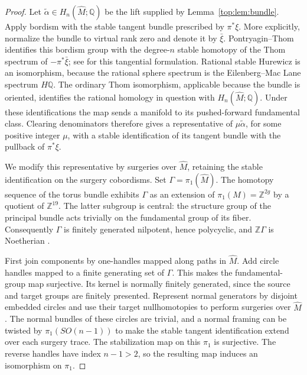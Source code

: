 \documentclass[11pt]{article}
\numberwithin{equation}{section}
\theoremstyle{definition}
\theoremstyle{remark}
\begin{document}
\begin{proof}
Let $\widetilde\alpha\in H_n(\widehat M;\mathbb Q)$ be the lift supplied by
Lemma~\ref{top:lem:bundle}.  Apply bordism with the stable tangent bundle
prescribed by $\pi^*\xi$.  More explicitly, normalize the bundle to
virtual rank zero and denote it by $\bar\xi$.  Pontryagin--Thom identifies
this bordism group with the degree-$n$ stable homotopy of the Thom spectrum
of $-\pi^*\bar\xi$; see \cite[Theorems~2.5--2.6]{Top:Rathel} for this
tangential formulation.  Rational stable Hurewicz is an isomorphism,
because the rational sphere spectrum is the Eilenberg--Mac Lane spectrum
$H\mathbb Q$.  The ordinary Thom isomorphism, applicable because the bundle is
oriented, identifies the rational homology in question with
$H_n(\widehat M;\mathbb Q)$.  Under these identifications the map sends a
manifold to its pushed-forward fundamental class.  Clearing denominators
therefore gives a representative of $\mu\widetilde\alpha$, for some
positive integer $\mu$, with a stable identification of its tangent
bundle with the pullback of $\pi^*\xi$.

We modify this representative by surgeries over $\widehat M$, retaining
the stable identification on the surgery cobordisms.  Set
$\Gamma=\pi_1(\widehat M)$.  The homotopy sequence of the torus bundle
exhibits $\Gamma$ as an extension of $\pi_1(M)=\mathbb Z^{2g}$ by a quotient
of $\mathbb Z^{19}$.  The latter subgroup is central: the structure group of
the principal bundle acts trivially on the fundamental group of its
fiber.  Consequently $\Gamma$ is finitely generated nilpotent, hence
polycyclic, and $\mathbb Z\Gamma$ is Noetherian \cite{Top:Hall}.

First join components by one-handles mapped along paths in
$\widehat M$.  Add circle handles mapped to a finite generating set of
$\Gamma$.  This makes the fundamental-group map surjective.  Its kernel
is normally finitely generated, since the source and target groups are
finitely presented.  Represent normal generators by disjoint embedded
circles and use their target nullhomotopies to perform surgeries over
$\widehat M$.  The normal bundles of these circles are trivial, and a
normal framing can be twisted by $\pi_1(SO(n-1))$ to make the stable
tangent identification extend over each surgery trace.  The stabilization
map on this $\pi_1$ is surjective.  The reverse handles have index
$n-1>2$, so the resulting map induces an isomorphism on $\pi_1$.


\end{proof}
\end{document}
